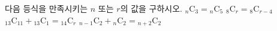 다음 등식을 만족시키는 $n$ 또는 $r$의 값을 구하시오.
 ${}_n\mathrm{C}_3={}_n\mathrm{C}_5$
 ${}_8\mathrm{C}_r={}_8\mathrm{C}_{r-4}$
 ${}_{13}\mathrm{C}_{11}+{}_{13}\mathrm{C}_1={}_{14}\mathrm{C}_r$
 ${}_{n-1}\mathrm{C}_2+{}_n\mathrm{C}_2={}_{n+2}\mathrm{C}_2$
